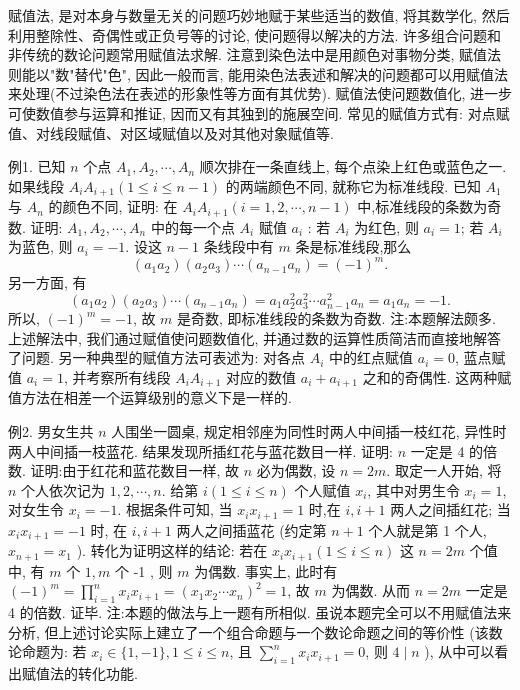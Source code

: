 
赋值法, 是对本身与数量无关的问题巧妙地赋于某些适当的数值, 将其数学化, 然后利用整除性、奇偶性或正负号等的讨论, 使问题得以解决的方法.
许多组合问题和非传统的数论问题常用赋值法求解.
注意到染色法中是用颜色对事物分类, 赋值法则能以"数"替代"色", 因此一般而言, 能用染色法表述和解决的问题都可以用赋值法来处理(不过染色法在表述的形象性等方面有其优势). 赋值法使问题数值化, 进一步可使数值参与运算和推证, 因而又有其独到的施展空间.
常见的赋值方式有: 对点赋值、对线段赋值、对区域赋值以及对其他对象赋值等.



例1. 已知 $n$ 个点 $A_1, A_2, \cdots, A_n$ 顺次排在一条直线上, 每个点染上红色或蓝色之一.
如果线段 $A_i A_{i+1}(1 \leqslant i \leqslant n-1)$ 的两端颜色不同, 就称它为标准线段.
已知 $A_1$ 与 $A_n$ 的颜色不同, 证明: 在 $A_i A_{i+1}(i=1,2, \cdots, n-1)$ 中,标准线段的条数为奇数.
证明: $A_1, A_2, \cdots, A_n$ 中的每一个点 $A_i$ 赋值 $a_i$ : 若 $A_i$ 为红色, 则 $a_i=1$; 若 $A_i$ 为蓝色, 则 $a_i=-1$.
设这 $n-1$ 条线段中有 $m$ 条是标准线段,那么
$$
\left(a_1 a_2\right)\left(a_2 a_3\right) \cdots\left(a_{n-1} a_n\right)=(-1)^m .
$$
另一方面, 有
$$
\left(a_1 a_2\right)\left(a_2 a_3\right) \cdots\left(a_{n-1} a_n\right)=a_1 a_2^2 a_3^2 \cdots a_{n-1}^2 a_n=a_1 a_n=-1 .
$$
所以, $(-1)^m=-1$, 故 $m$ 是奇数, 即标准线段的条数为奇数.
注:本题解法颇多.
上述解法中, 我们通过赋值使问题数值化, 并通过数的运算性质简洁而直接地解答了问题.
另一种典型的赋值方法可表述为: 对各点 $A_i$ 中的红点赋值 $a_i=0$, 蓝点赋值 $a_i=1$, 并考察所有线段 $A_i A_{i+1}$ 对应的数值 $a_i+a_{i+1}$ 之和的奇偶性.
这两种赋值方法在相差一个运算级别的意义下是一样的.



例2. 男女生共 $n$ 人围坐一圆桌, 规定相邻座为同性时两人中间插一枝红花, 异性时两人中间插一枝蓝花.
结果发现所插红花与蓝花数目一样.
证明: $n$ 一定是 4 的倍数.
证明:由于红花和蓝花数目一样, 故 $n$ 必为偶数, 设 $n=2 m$.
取定一人开始, 将 $n$ 个人依次记为 $1,2, \cdots, n$. 给第 $i(1 \leqslant i \leqslant n)$ 个人赋值 $x_i$, 其中对男生令 $x_i=1$, 对女生令 $x_i=-1$.
根据条件可知, 当 $x_i x_{i+1}=1$ 时,在 $i, i+1$ 两人之间插红花; 当 $x_i x_{i+1}=-1$ 时, 在 $i, i+1$ 两人之间插蓝花 (约定第 $n+1$ 个人就是第 1 个人, $x_{n+1}=x_1$ ).
转化为证明这样的结论: 若在 $x_i x_{i+1}(1 \leqslant i \leqslant n)$ 这 $n=2 m$ 个值中, 有 $m$ 个 $1, m$ 个 -1 , 则 $m$ 为偶数.
事实上, 此时有 $(-1)^m=\prod_{i=1}^n x_i x_{i+1}=\left(x_1 x_2 \cdots x_n\right)^2=1$, 故 $m$ 为偶数.
从而 $n=2 m$ 一定是 4 的倍数.
证毕.
注:本题的做法与上一题有所相似.
虽说本题完全可以不用赋值法来分析, 但上述讨论实际上建立了一个组合命题与一个数论命题之间的等价性 (该数论命题为: 若 $x_i \in\{1,-1\}, 1 \leqslant i \leqslant n$, 且 $\sum_{i=1}^n x_i x_{i+1}=0$, 则 $4 \mid n$ ), 从中可以看出赋值法的转化功能.



